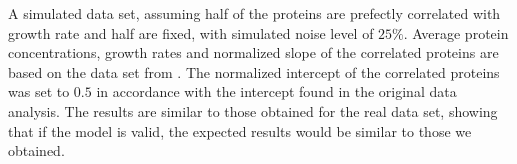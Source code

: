 \label{fig:simulated}
A simulated data set, assuming half of the proteins are prefectly correlated with growth rate and half are fixed, with simulated noise level of $25\%$.
Average protein concentrations, growth rates and normalized slope of the correlated proteins are based on the data set from \cite{Heinemann2015}.
The normalized intercept of the correlated proteins was set to $0.5$ in accordance with the intercept found in the original data analysis.
The results are similar to those obtained for the real data set, showing that if the model is valid, the expected results would be similar to those we obtained.
